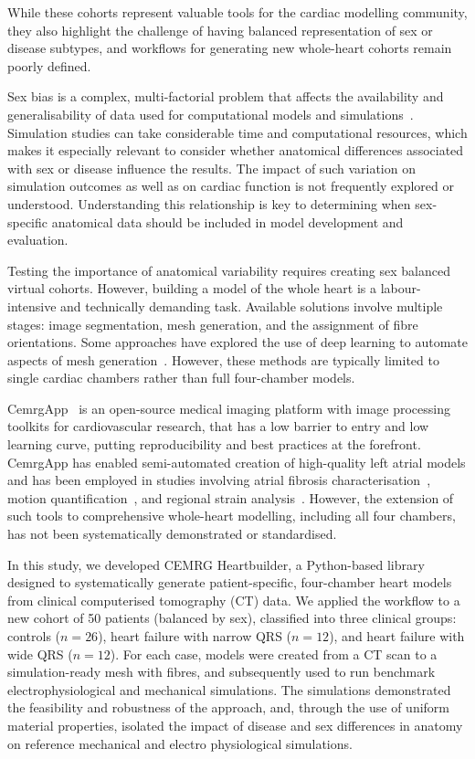 While these cohorts represent valuable tools for the cardiac modelling community, 
they also highlight the challenge of having balanced representation of sex or disease subtypes, and 
workflows for generating new whole-heart cohorts remain poorly defined.

Sex bias is a complex, multi-factorial problem that affects the availability and generalisability 
of data used for computational models and simulations~\cite{steuernagel2023_sex_bias}.
Simulation studies can take considerable time and computational resources, 
which makes it especially relevant to consider whether anatomical differences associated with sex 
or disease influence the results.
The impact of such variation on simulation outcomes as well as on cardiac function is not frequently explored
or understood.
Understanding this relationship is key to determining when sex-specific anatomical data should be 
included in model development and evaluation.

Testing the importance of anatomical variability requires creating sex balanced virtual cohorts. 
However, building a model of the whole heart is a labour-intensive and technically demanding task.
Available solutions involve multiple stages: 
image segmentation, mesh generation, and the assignment of fibre orientations. 
Some approaches have explored the use of deep learning to automate aspects of 
mesh generation~\cite{pak2024_ai_meshes}. 
However, these methods are typically limited to single cardiac chambers rather than 
full four-chamber models.

CemrgApp~\cite{Razeghi2020-cemrgapp} is an open-source medical imaging platform with 
image processing toolkits for cardiovascular research, that has a low barrier to entry 
and low learning curve, putting reproducibility and best practices at the forefront.
CemrgApp has enabled semi-automated creation of high-quality left atrial models and 
has been employed in studies involving 
atrial fibrosis characterisation~\cite{Sim2019-reproducibility}, 
motion quantification~\cite{sillett2024_motion}, and 
regional strain analysis~\cite{sillett2023_strain1}. 
However, the extension of such tools to comprehensive whole-heart modelling, including 
all four chambers, has not been systematically demonstrated or standardised.

In this study, we developed CEMRG Heartbuilder, a Python-based library designed to systematically 
generate patient-specific, four-chamber heart models from clinical computerised tomography (CT) data. 
We applied the workflow to a new cohort of 50 patients (balanced by sex), 
classified into three clinical groups: controls ($n=26$), heart failure with narrow QRS ($n=12$), 
and heart failure with wide QRS ($n=12$). For each case, models were created from a CT scan 
to a simulation-ready mesh with fibres, and subsequently used to run benchmark electrophysiological and 
mechanical simulations. 
The simulations demonstrated the feasibility and robustness of the approach,
and, through the use of uniform material properties, isolated the impact of disease and sex differences 
in anatomy on reference mechanical and electro physiological simulations.

